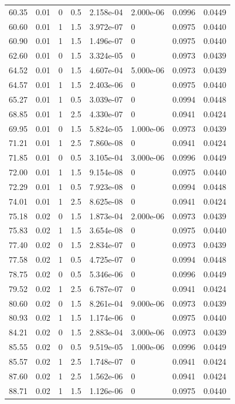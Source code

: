 \documentclass[preview]{standalone}
\begin{document}
{{{\begin{tabular}{L{1.2cm}C{1.2cm} C{0.3cm}C{0.5cm} C{1.4cm}C{1.4cm} C{1.4cm}C{1.4cm}}
  60.35  &  0.01  & 0     & 0.5 &  2.158e-04  & 2.000e-06  & 0.0996 &  0.0449   \\ 
  60.60  &  0.01  & 1     & 1.5 &  3.972e-07  & 0  & 0.0975 &  0.0440   \\ 
  60.90  &  0.01  & 1     & 1.5 &  1.496e-07  & 0  & 0.0975 &  0.0440   \\ 
  62.60  &  0.01  & 0     & 1.5 &  3.324e-05  & 0  & 0.0973 &  0.0439   \\ 
  64.52  &  0.01  & 0     & 1.5 &  4.607e-04  & 5.000e-06  & 0.0973 &  0.0439   \\ 
  64.57  &  0.01  & 1     & 1.5 &  2.403e-06  & 0  & 0.0975 &  0.0440   \\ 
  65.27  &  0.01  & 1     & 0.5 &  3.039e-07  & 0  & 0.0994 &  0.0448   \\ 
  68.85  &  0.01  & 1     & 2.5 &  4.330e-07  & 0  & 0.0941 &  0.0424   \\ 
  69.95  &  0.01  & 0     & 1.5 &  5.824e-05  & 1.000e-06  & 0.0973 &  0.0439   \\ 
  71.21  &  0.01  & 1     & 2.5 &  7.860e-08  & 0  & 0.0941 &  0.0424   \\ 
  71.85  &  0.01  & 0     & 0.5 &  3.105e-04  & 3.000e-06  & 0.0996 &  0.0449   \\ 
  72.00  &  0.01  & 1     & 1.5 &  9.154e-08  & 0  & 0.0975 &  0.0440   \\ 
  72.29  &  0.01  & 1     & 0.5 &  7.923e-08  & 0  & 0.0994 &  0.0448   \\ 
  74.01  &  0.01  & 1     & 2.5 &  8.625e-08  & 0  & 0.0941 &  0.0424   \\ 
  75.18  &  0.02  & 0     & 1.5 &  1.873e-04  & 2.000e-06  & 0.0973 &  0.0439   \\ 
  75.83  &  0.02  & 1     & 1.5 &  3.654e-08  & 0  & 0.0975 &  0.0440   \\ 
  77.40  &  0.02  & 0     & 1.5 &  2.834e-07  & 0  & 0.0973 &  0.0439   \\ 
  77.58  &  0.02  & 1     & 0.5 &  4.725e-07  & 0  & 0.0994 &  0.0448   \\ 
  78.75  &  0.02  & 0     & 0.5 &  5.346e-06  & 0  & 0.0996 &  0.0449   \\ 
  79.52  &  0.02  & 1     & 2.5 &  6.787e-07  & 0  & 0.0941 &  0.0424   \\ 
  80.60  &  0.02  & 0     & 1.5 &  8.261e-04  & 9.000e-06  & 0.0973 &  0.0439   \\ 
  80.93  &  0.02  & 1     & 1.5 &  1.174e-06  & 0  & 0.0975 &  0.0440   \\ 
  84.21  &  0.02  & 0     & 1.5 &  2.883e-04  & 3.000e-06  & 0.0973 &  0.0439   \\ 
  85.55  &  0.02  & 0     & 0.5 &  9.519e-05  & 1.000e-06  & 0.0996 &  0.0449   \\ 
  85.57  &  0.02  & 1     & 2.5 &  1.748e-07  & 0  & 0.0941 &  0.0424   \\ 
  87.60  &  0.02  & 1     & 2.5 &  1.562e-06  & 0  & 0.0941 &  0.0424   \\ 
  88.71  &  0.02  & 1     & 1.5 &  1.126e-06  & 0  & 0.0975 &  0.0440   \\ 
\hline 
\end{tabular} 

}}}
\end{document}
